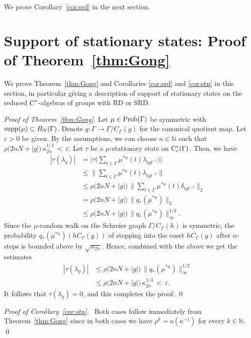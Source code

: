 \documentclass[12pt]{amsart}
\theoremstyle{definition}
\theoremstyle{remark}
\newcommand{\bN}{{\mathbb{N}}}
\newcommand{\G}{\Gamma}
\newcommand{\ep}{\varepsilon}
\begin{document}
\medskip

We prove Corollary~\ref{cor:srd} in the next section.

\section{Support of stationary states: Proof of Theorem~\ref{thm:Gong}}

We prove Theorem~\ref{thm:Gong} and Corollaries \ref{cor:srd} and \ref{cor:stn} in this section, in particular giving a description of support of stationary states on the reduced $\textup{C}^*$-algebras of groups with \textup{RD} or \textup{SRD}.

\medskip

\noindent
{\it Proof of Theorem~\ref{thm:Gong}.}
Let $\mu\in{\rm Prob}(\G)$ be symmetric with ${\rm supp}(\mu)\subset B_N(\G)$. 
Denote $q: \G\to \G/C_\G(g)$ for the canonical quotient map. 
Let $\ep>0$ be given. By the assumptions, we can choose $n\in\bN$ such that $\rho\big(2nN+|g|\big)\,\kappa_{2n}^{1/4}
\,<\,\ep$.
Let $\tau$ be a $\mu$-stationary state on $\textup{C}^*_r(\G)$. 
Then, we have
\begin{align*}
|\tau(\lambda_g)| &= \big|\tau\big(\sum_{t\in\Gamma}\mu^{*n}(t)\lambda_{tgt^{-1}}\big)\big| 
\\&\le \big\|\sum_{t\in\Gamma}\mu^{*n}(t)\lambda_{tgt^{-1}}\big\|
\\&\leq \rho\big(2nN+|g|\big)\,\big\|\sum_{t\in\Gamma}\mu^{*n}(t)\delta_{tgt^{-1}}\big\|_2
\\&=
\rho\big(2nN+|g|\big)\,\big\|q_*(\mu^{*n})\big\|_2
\\&\le
\rho\big(2nN+|g|\big)\,\big\|q_*(\mu^{*n})\big\|_\infty^{1/2} .
\end{align*}
Since the $\mu$-random walk on the Schreier graph $\G/C_\G(h)$ is symmetric, the probability $q_*(\mu^{*n})(hC_\G(g))$ of stepping into the coset $hC_\G(g)$ after $n$-steps is bounded above by $\sqrt{\kappa_{2n}}$.
Hence, combined with the above we get the estimates
\[\begin{split}
|\tau(\lambda_g)| &\le 
\rho\big(2nN+|g|\big)\,\big\|q_*(\mu^{*n})\big\|_\infty^{1/2}
\\ &\le \rho\big(2nN+|g|\big)\,\kappa_{2n}^{1/4}
\,<\,\ep .
\end{split}\]
It follows that $\tau(\lambda_g)=0$, and this completes the proof. 
\qed




\medskip


\noindent
{\it Proof of Corollary~\ref{cor:stn}.}~
Both cases follow immediately from Theorem~\ref{thm:Gong} since in both cases we have $\rho^k={o}(\kappa^{-1})$ for every $k\in\bN$. \qed
\end{document}
